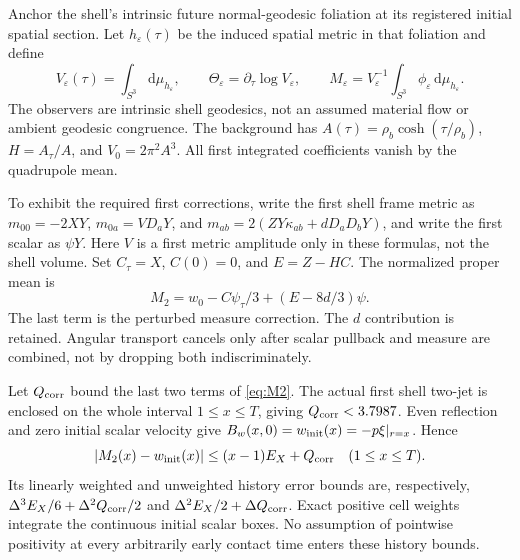 \documentclass[11pt]{article}
\newcommand{\eps}{\varepsilon}
\newcommand{\dd}{\mathrm d}
\begin{document}
Anchor the shell's intrinsic future normal-geodesic foliation at its
registered initial spatial section. Let $h_\eps(\tau)$ be the induced
spatial metric in that foliation and define
\begin{equation}
 V_\eps(\tau)=\int_{S^3}\dd\mu_{h_\eps},\qquad
 \Theta_\eps=\partial_\tau\log V_\eps,\qquad
 M_\eps=V_\eps^{-1}\int_{S^3}\phi_\eps\,\dd\mu_{h_\eps}.
 \label{eq:observables}
\end{equation}
The observers are intrinsic shell geodesics, not an assumed material flow
or ambient geodesic congruence. The background has
$A(\tau)=\rho_b\cosh(\tau/\rho_b)$,
$H=A_\tau/A$, and $V_0=2\pi^2A^3$.
All first integrated coefficients vanish by the quadrupole mean.

To exhibit the required first corrections, write the first shell frame
metric as $m_{00}=-2XY$, $m_{0a}=V D_aY$, and
$m_{ab}=2(ZY\kappa_{ab}+dD_aD_bY)$, and write the first scalar as
$\psi Y$. Here $V$ is a first metric amplitude only in these formulas,
not the shell volume. Set
$C_\tau=X$, $C(0)=0$, and $E=Z-HC$.
The normalized proper mean is
\begin{equation}
 M_2=w_0-C\psi_\tau/3+(E-8d/3)\psi. \label{eq:M2}
\end{equation}
The last term is the perturbed measure correction. The $d$ contribution
is retained. Angular transport cancels only after scalar pullback and
measure are combined, not by dropping both indiscriminately.

Let $Q_{\rm corr}$ bound the last two terms of \eqref{eq:M2}. The actual
first shell two-jet is enclosed on the whole interval $1\le x\le T$,
giving $Q_{\rm corr}<3.7987$. Even reflection and zero initial scalar
velocity give $B_w(x,0)=w_{\rm init}(x)=-p\xi|_{r=x}$. Hence
\begin{equation}
 |M_2(x)-w_{\rm init}(x)|\le(x-1)E_X+Q_{\rm corr}\quad(1\le x\le T).
 \label{eq:Merror}
\end{equation}
Its linearly weighted and unweighted history error bounds are, respectively,
$\Delta^3 E_X/6+\Delta^2Q_{\rm corr}/2$ and
$\Delta^2 E_X/2+\Delta Q_{\rm corr}$. Exact positive cell weights integrate
the continuous initial scalar boxes. No assumption of pointwise positivity
at every arbitrarily early contact time enters these history bounds.
\end{document}
